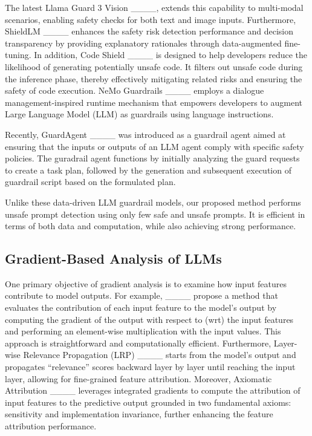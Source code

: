 The latest Llama Guard 3 Vision ____, extends this capability to multi-modal scenarios, enabling safety checks for both text and image inputs. Furthermore, ShieldLM ____ enhances the safety risk detection performance and decision transparency by providing explanatory rationales through data-augmented fine-tuning. In addition, Code Shield ____ is designed to help developers reduce the likelihood of generating potentially unsafe code. It filters out unsafe code during the inference phase, thereby effectively mitigating related risks and ensuring the safety of code execution. NeMo Guardrails ____ employs a dialogue management-inspired runtime mechanism that empowers developers to augment Large Language Model (LLM) as guardrails using language instructions. 

Recently, GuardAgent ____ was introduced as a guardrail agent aimed at ensuring that the inputs or outputs of an LLM agent comply with specific safety policies. The guradrail agent functions by initially analyzing the guard requests to create a task plan, followed by the generation and subsequent execution of guardrail script based on the formulated plan. 

Unlike these data-driven LLM guardrail models, our proposed method performs unsafe prompt detection using only few safe and unsafe prompts. It is efficient in terms of both data and computation, while also achieving strong performance. 

\subsection{Gradient-Based Analysis of LLMs}
One primary objective of gradient analysis is to examine how input features contribute to model outputs. For example, ____ propose a method that evaluates the contribution of each input feature to the model’s output by computing the gradient of the output with respect to (wrt) the input features and performing an element-wise multiplication with the input values. This approach is straightforward and computationally efficient. Furthermore, Layer-wise Relevance Propagation (LRP) ____ starts from the model's output and propagates ``relevance'' scores backward layer by layer until reaching the input layer, allowing for fine-grained feature attribution. Moreover, Axiomatic Attribution ____ leverages integrated gradients to compute the attribution of input features to the predictive output grounded in two fundamental axioms: sensitivity and implementation invariance, further enhancing the feature attribution performance.

